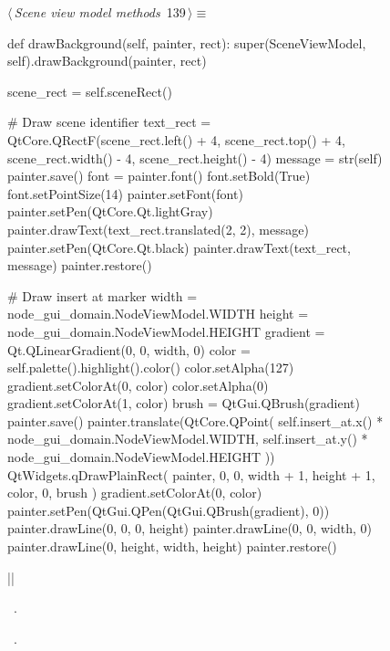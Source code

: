 \documentclass[%
    a4paper,    %
    justified,  %
    nobib,      %
    openany     %
]{tufte-book}
\makeatletter
\renewcommand{\label}[1]{\@tufte@label{##1}}%
\makeatother
\begin{document}
\begin{figure}[!htbp]
\begin{flushleft} \small
\begin{minipage}{\linewidth}\label{scrap90}\raggedright\small
{} $\langle\,${\itshape Scene view model methods}\nobreak\ {\footnotesize {139}}$\,\rangle\equiv$
\vspace{-1ex}
\begin{pythoncode}
def drawBackground(self, painter, rect):
    super(SceneViewModel, self).drawBackground(painter, rect)

    scene_rect = self.sceneRect()

    # Draw scene identifier
    text_rect = QtCore.QRectF(scene_rect.left()   + 4,
                              scene_rect.top()    + 4,
                              scene_rect.width()  - 4,
                              scene_rect.height() - 4)
    message = str(self)
    painter.save()
    font = painter.font()
    font.setBold(True)
    font.setPointSize(14)
    painter.setFont(font)
    painter.setPen(QtCore.Qt.lightGray)
    painter.drawText(text_rect.translated(2, 2), message)
    painter.setPen(QtCore.Qt.black)
    painter.drawText(text_rect, message)
    painter.restore()

    # Draw insert at marker
    width    = node_gui_domain.NodeViewModel.WIDTH
    height   = node_gui_domain.NodeViewModel.HEIGHT
    gradient = Qt.QLinearGradient(0, 0, width, 0)
    color    = self.palette().highlight().color()
    color.setAlpha(127)
    gradient.setColorAt(0, color)
    color.setAlpha(0)
    gradient.setColorAt(1, color)
    brush = QtGui.QBrush(gradient)
    painter.save()
    painter.translate(QtCore.QPoint(
        self.insert_at.x() * node_gui_domain.NodeViewModel.WIDTH,
        self.insert_at.y() * node_gui_domain.NodeViewModel.HEIGHT
    ))
    QtWidgets.qDrawPlainRect(
        painter, 0, 0, width + 1, height + 1, color, 0, brush
    )
    gradient.setColorAt(0, color)
    painter.setPen(QtGui.QPen(QtGui.QBrush(gradient), 0))
    painter.drawLine(0, 0, 0, height)
    painter.drawLine(0, 0, width, 0)
    painter.drawLine(0, height, width, height)
    painter.restore()

|\NWsep|
\end{pythoncode}
\vspace{1.5ex}
\footnotesize
\begin{list}{}{\setlength{\itemsep}{-\parsep}\setlength{\itemindent}{-\leftmargin}}
\item \NWtxtMacroDefBy\ .
\item \NWtxtMacroRefIn\ .


\end{list}
\end{minipage}
\end{flushleft}
\end{figure}
\end{document}
